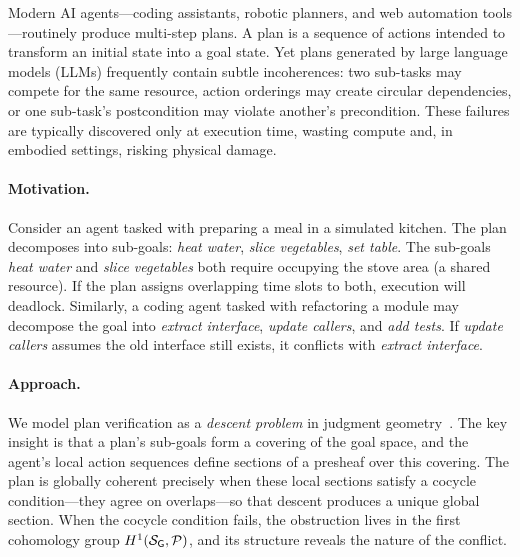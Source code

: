 \documentclass[11pt]{article}
\newcommand{\PlanSheaf}{\mathcal{P}}
\newcommand{\GoalSite}{\Site_{\mathsf{G}}}
\begin{document}
Modern AI agents---coding assistants, robotic planners, and
web automation tools---routinely produce multi-step plans.  A plan is a
sequence of actions intended to transform an initial state into
a goal state.  Yet plans generated by large language models (LLMs)
frequently contain subtle incoherences: two sub-tasks may compete
for the same resource, action orderings may create circular
dependencies, or one sub-task's postcondition may violate another's
precondition.  These failures are typically discovered only at
execution time, wasting compute and, in embodied settings,
risking physical damage.

\paragraph{Motivation.}
Consider an agent tasked with preparing a meal in a simulated kitchen.  The plan decomposes into sub-goals: \emph{heat water},
\emph{slice vegetables}, \emph{set table}.  The sub-goals
\emph{heat water} and \emph{slice vegetables} both require
occupying the stove area (a shared resource).  If the plan assigns
overlapping time slots to both, execution will deadlock.  Similarly,
a coding agent tasked with refactoring a module may decompose the
goal into \emph{extract interface}, \emph{update callers}, and
\emph{add tests}.  If \emph{update callers} assumes the old
interface still exists, it conflicts with \emph{extract interface}.

\paragraph{Approach.}
We model plan verification as a \emph{descent problem} in judgment
geometry~\cite{paper00}.  The key insight is that a plan's
sub-goals form a covering of the goal space, and the agent's local
action sequences define sections of a presheaf over this covering.
The plan is globally coherent precisely when these local sections
satisfy a cocycle condition---they agree on overlaps---so that
descent produces a unique global section.  When the cocycle
condition fails, the obstruction lives in the first cohomology
group $\Hcoh{1}(\GoalSite, \PlanSheaf)$, and its structure
reveals the nature of the conflict.
\end{document}
